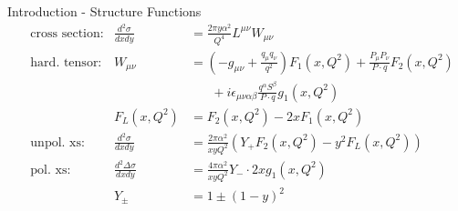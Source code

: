 \begin{frame}[<+->]{Introduction - Structure Functions}
\begin{align}
&\text{cross section:}&\frac{d^2\sigma}{dx dy} &= \frac{2\pi y \alpha^2}{Q^4} L^{\mu\nu} W_{\mu\nu}\\
&\text{hard. tensor:}&W_{\mu\nu} &= \left(-g_{\mu\nu} + \frac{q_\mu q_\nu}{q^2}\right) F_1(x,Q^2) + \frac{P_\mu P_\nu}{P\cdot q} F_2(x,Q^2) \nonumber\\
&& & \hspace{20pt} + i \epsilon_{\mu\nu\alpha\beta} \frac{q^{\alpha}S^{\beta}}{P\cdot q} g_1(x,Q^2)\\
&&F_L(x,Q^2) &= F_2(x,Q^2) - 2xF_1(x,Q^2)\\
&\text{unpol. xs:}&\frac{d^2\sigma}{dx dy} &= \frac{2\pi \alpha^2}{x y Q^2}\left(Y_+F_2(x,Q^2) - y^2F_L(x,Q^2)\right)\\
&\text{pol. xs:}&\frac{d^2\Delta\sigma}{dx dy} &= \frac{4\pi \alpha^2}{x y Q^2}Y_-\cdot 2xg_1(x,Q^2)\\
&&Y_\pm &= 1 \pm (1-y)^2
\end{align}
\end{frame}
